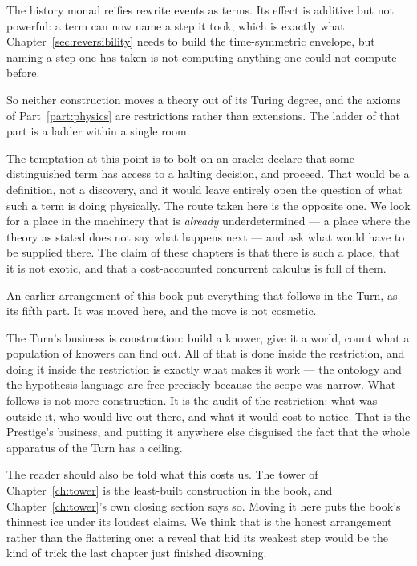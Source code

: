 The history monad reifies rewrite events as terms.
Its effect is additive but not powerful: a term can now name a step it
took, which is exactly what Chapter~\ref{sec:reversibility} needs to
build the time-symmetric envelope, but naming a step one has taken is
not computing anything one could not compute before.

So neither construction moves a theory out of its Turing degree, and the
axioms of Part~\ref{part:physics} are restrictions rather than
extensions.
The ladder of that part is a ladder within a single room.

\begin{remark}
\label{rmk:ent-not-a-defect}
The temptation at this point is to bolt on an oracle: declare that some
distinguished term has access to a halting decision, and proceed.
That would be a definition, not a discovery, and it would leave entirely
open the question of what such a term is doing physically.
The route taken here is the opposite one.
We look for a place in the machinery that is \emph{already}
underdetermined --- a place where the theory as stated does not say what
happens next --- and ask what would have to be supplied there.
The claim of these chapters is that there is such a place, that it is not
exotic, and that a cost-accounted concurrent calculus is full of them.
\end{remark}

\begin{remark}
\label{rmk:why-here}
An earlier arrangement of this book put everything that follows in the
Turn, as its fifth part.
It was moved here, and the move is not cosmetic.

The Turn's business is construction: build a knower, give it a world,
count what a population of knowers can find out.
All of that is done inside the restriction, and doing it inside the
restriction is exactly what makes it work --- the ontology and the
hypothesis language are free precisely because the scope was narrow.
What follows is not more construction.
It is the audit of the restriction: what was outside it, who would live
out there, and what it would cost to notice.
That is the Prestige's business, and putting it anywhere else disguised
the fact that the whole apparatus of the Turn has a ceiling.

The reader should also be told what this costs us.
The tower of Chapter~\ref{ch:tower} is the least-built construction in
the book, and Chapter~\ref{ch:tower}'s own closing section says so.
Moving it here puts the book's thinnest ice under its loudest claims.
We think that is the honest arrangement rather than the flattering one:
a reveal that hid its weakest step would be the kind of trick the last
chapter just finished disowning.
\end{remark}

